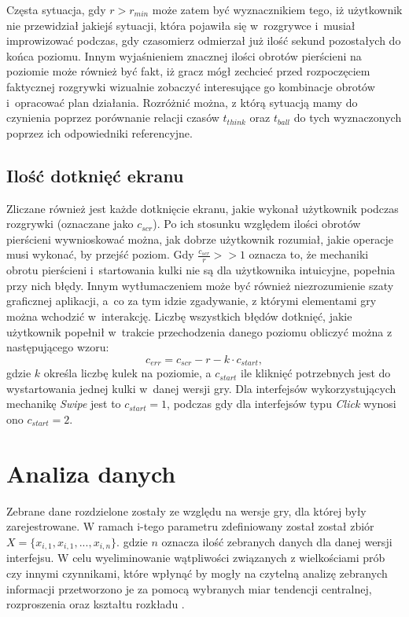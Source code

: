 \documentclass[a4paper,12pt,numbers=noenddot]{report}
\begin{document}
Częsta sytuacja, gdy $r > r_{min}$  może zatem być wyznacznikiem tego, iż użytkownik nie przewidział jakiejś sytuacji, która pojawiła się w~rozgrywce i~musiał improwizować podczas, gdy czasomierz odmierzał już ilość sekund pozostałych do końca poziomu. Innym wyjaśnieniem znacznej ilości obrotów pierścieni na poziomie może również być fakt, iż gracz mógł zechcieć przed rozpoczęciem faktycznej rozgrywki wizualnie zobaczyć interesujące go kombinacje obrotów i~opracować plan działania. Rozróżnić można, z którą sytuacją mamy do czynienia poprzez porównanie relacji czasów $t_{think}$ oraz $t_{ball}$ do tych wyznaczonych poprzez ich odpowiedniki referencyjne.
	\subsection{Ilość dotknięć ekranu}
Zliczane również jest każde dotknięcie ekranu, jakie wykonał użytkownik podczas rozgrywki (oznaczane jako $c_{scr}$). Po ich stosunku względem ilości obrotów pierścieni wywnioskować można, jak dobrze użytkownik rozumiał, jakie operacje musi wykonać, by przejść poziom. Gdy $\frac{c_{scr}}{r} >> 1$ oznacza to, że mechaniki obrotu pierścieni i~startowania kulki nie są dla użytkownika intuicyjne, popełnia przy nich błędy. Innym wytłumaczeniem może być również niezrozumienie szaty graficznej aplikacji, a~co za tym idzie zgadywanie, z którymi elementami gry można wchodzić w~interakcję. Liczbę wszystkich błędów dotknięć, jakie użytkownik popełnił w~trakcie przechodzenia danego poziomu obliczyć można z następującego wzoru:
\begin{equation}
\label{eq_errors}
c_{err} = c_{scr} - r - k \cdot c_{start},
\end{equation}
gdzie $k$ określa liczbę kulek na poziomie, a $c_{start}$ ile kliknięć potrzebnych jest do wystartowania jednej kulki w~danej wersji gry. Dla interfejsów wykorzystujących mechanikę \textit{Swipe} jest to $c_{start} = 1$, podczas gdy dla interfejsów typu \textit{Click} wynosi ono $c_{start} = 2$.
\section{Analiza danych}
Zebrane dane rozdzielone zostały ze względu na wersje gry, dla której były zarejestrowane. W ramach i-tego parametru zdefiniowany został został zbiór $X = \{x_{i,1},x_{i,1},..., x_{i,n}\}$. gdzie $n$ oznacza ilość zebranych danych dla danej wersji interfejsu. W celu wyeliminowanie wątpliwości związanych z wielkościami prób czy innymi czynnikami, które wpłynąć by mogły na czytelną analizę zebranych informacji przetworzono je za pomocą wybranych miar tendencji centralnej, rozproszenia oraz kształtu rozkładu \cite{online_Statistics}.
\end{document}
